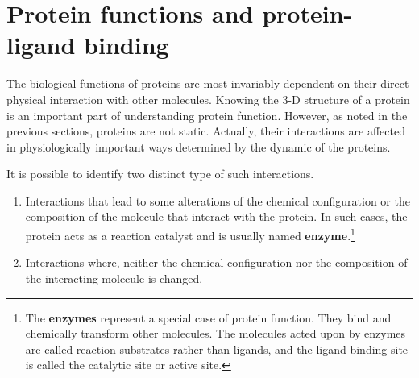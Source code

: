 \section{Protein functions and protein-ligand binding}
The biological functions of proteins are most invariably dependent on their direct physical interaction with other molecules. 
Knowing the 3-D structure of a protein is an important part of understanding protein function. However, as noted in the previous sections, proteins are not static. Actually, their interactions are affected in physiologically important ways determined by the dynamic of the proteins.%

It is possible to identify two distinct type of such interactions.
\begin{enumerate}
\item Interactions that lead to some alterations of the chemical configuration or the composition of the molecule that interact with the protein. In such cases, the protein acts as a reaction catalyst and is usually named \textbf{enzyme}.\footnote{The \textbf{enzymes} represent a special case of protein function. They bind and chemically transform other molecules. The molecules acted upon by enzymes are called reaction substrates rather than ligands, and the ligand-binding site is called the catalytic site or active site.}
\item Interactions where, neither the chemical configuration nor the composition of the interacting molecule is changed.
\end{enumerate}

